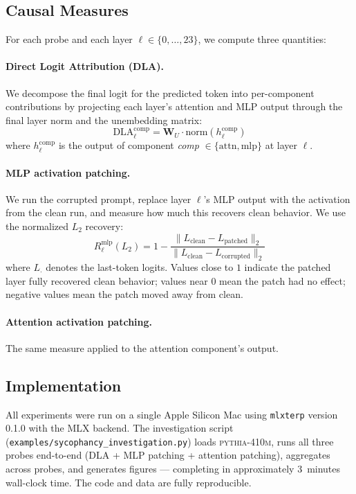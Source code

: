 \documentclass[10pt,letterpaper]{article}
\begin{document}
\subsection{Causal Measures}

For each probe and each layer $\ell \in \{0, \ldots, 23\}$, we compute three quantities:

\paragraph{Direct Logit Attribution (DLA).} We decompose the final logit for the predicted token into per-component contributions by projecting each layer's attention and MLP output through the final layer norm and the unembedding matrix:
\begin{equation}
  \mathrm{DLA}_\ell^{\mathrm{comp}} = \mathbf{W}_U \cdot \mathrm{norm}(h_\ell^{\mathrm{comp}})
\end{equation}
where $h_\ell^{\mathrm{comp}}$ is the output of component \textit{comp} $\in \{\mathrm{attn}, \mathrm{mlp}\}$ at layer $\ell$.

\paragraph{MLP activation patching.} We run the corrupted prompt, replace layer $\ell$'s MLP output with the activation from the clean run, and measure how much this recovers clean behavior. We use the normalized $L_2$ recovery:
\begin{equation}
  R_\ell^{\mathrm{mlp}}(L_2) = 1 - \frac{\lVert L_{\mathrm{clean}} - L_{\mathrm{patched}} \rVert_2}{\lVert L_{\mathrm{clean}} - L_{\mathrm{corrupted}} \rVert_2}
\end{equation}
where $L_\cdot$ denotes the last-token logits. Values close to $1$ indicate the patched layer fully recovered clean behavior; values near $0$ mean the patch had no effect; negative values mean the patch moved away from clean.

\paragraph{Attention activation patching.} The same measure applied to the attention component's output.

\subsection{Implementation}

All experiments were run on a single Apple Silicon Mac using \texttt{mlxterp} version 0.1.0 with the MLX backend. The investigation script (\texttt{examples/sycophancy\_investigation.py}) loads \textsc{pythia-410m}, runs all three probes end-to-end (DLA + MLP patching + attention patching), aggregates across probes, and generates figures — completing in approximately 3~minutes wall-clock time. The code and data are fully reproducible.
\end{document}
